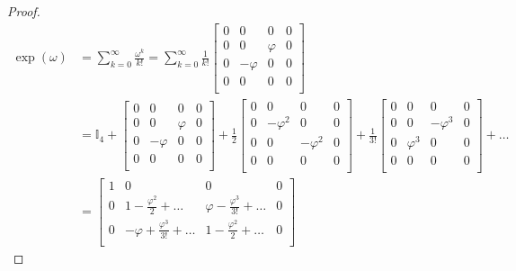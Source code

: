 \begin{example}
\begin{proof}
            \begin{equation*}
            \begin{aligned}
                \exp(\omega) & = \sum_{k = 0}^\infty \frac{\omega^k}{k!} = \sum_{k=0}^{\infty} \frac{1}{k!} \begin{bmatrix}
                    0 & 0 & 0 & 0 \\
                    0 & 0 & \varphi & 0 \\
                    0 & -\varphi & 0 & 0 \\
                    0 & 0 & 0 & 0 \\
                \end{bmatrix} \\ & = \mathbb I_4 + \begin{bmatrix}
                    0 & 0 & 0 & 0 \\
                    0 & 0 & \varphi & 0 \\
                    0 & -\varphi & 0 & 0 \\
                    0 & 0 & 0 & 0 \\
                \end{bmatrix} + \frac{1}{2}\begin{bmatrix}
                    0 & 0 & 0 & 0 \\
                    0 & -\varphi^2 & 0 & 0 \\
                    0 & 0 & -\varphi^2 & 0 \\
                    0 & 0 & 0 & 0 \\
                \end{bmatrix} + \frac{1}{3!} \begin{bmatrix}
                    0 & 0 & 0 & 0 \\
                    0 & 0 & - \varphi^3 & 0 \\
                    0 & \varphi^3 & 0 & 0 \\
                    0 & 0 & 0 & 0 \\
                \end{bmatrix} + \ldots \\ & = \begin{bmatrix}
                    1 & 0 & 0 & 0 \\
                    0 & 1 - \frac{\varphi^2}{2} + \ldots & \varphi - \frac{\varphi^3}{3!} + \ldots & 0 \\
                    0 & - \varphi + \frac{\varphi^3}{3!} + \ldots & 1 - \frac{\varphi^2}{2} + \ldots & 0 \\

\end{bmatrix}
\end{aligned}
\end{equation*}
\end{proof}
\end{example}
